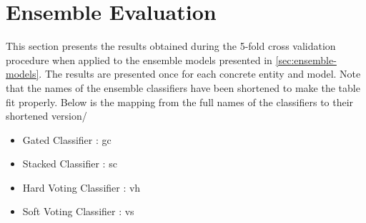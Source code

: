 \documentclass[epsfig,a4paper,11pt,titlepage,twoside,openany]{book}
\begin{document}
\section{Ensemble Evaluation}
\label{sec:ensemble-evaluation}

This section presents the results obtained during the 5-fold cross validation procedure when applied to the ensemble models presented in \autoref{sec:ensemble-models}. The results are presented once for each concrete entity and model. Note that the names of the ensemble classifiers have been shortened to make the table fit properly. Below is the mapping from the full names of the classifiers to their shortened version/ 

\begin{itemize}
    \item Gated Classifier : gc
    \item Stacked Classifier : sc
    \item Hard Voting Classifier : vh
    \item Soft Voting Classifier : vs
\end{itemize}
\end{document}
